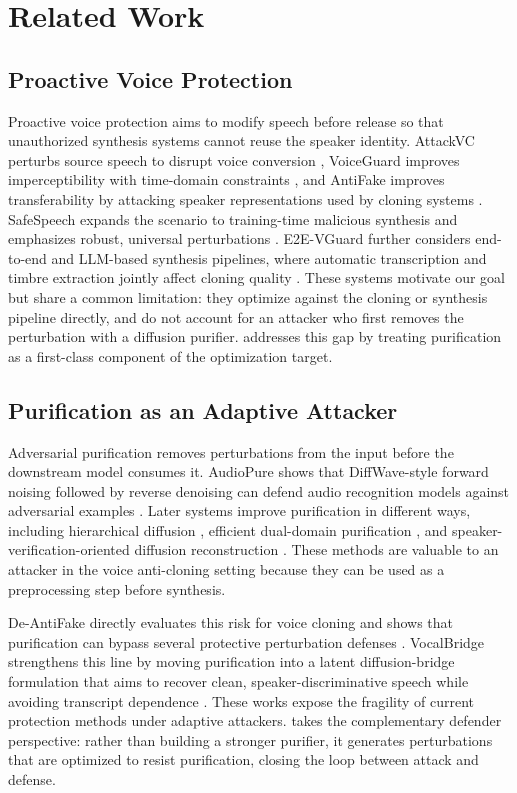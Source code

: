 \section{Related Work}

\subsection{Proactive Voice Protection}

Proactive voice protection aims to modify speech before release so that unauthorized synthesis systems cannot reuse the speaker identity. 
AttackVC perturbs source speech to disrupt voice conversion \cite{huang2021attackvc}, 
VoiceGuard improves imperceptibility with time-domain constraints \cite{li2023voiceguard}, 
and AntiFake improves transferability by attacking speaker representations used by cloning systems \cite{yu2023antifake}. 
SafeSpeech expands the scenario to training-time malicious synthesis and emphasizes robust, universal perturbations \cite{zhang2025safespeech}. 
E2E-VGuard further considers end-to-end and LLM-based synthesis pipelines, where automatic transcription and timbre extraction jointly affect cloning quality \cite{zhang2025e2evguard}. 
These systems motivate our goal but share a common limitation: they optimize against the cloning or synthesis pipeline directly, 
and do not account for an attacker who first removes the perturbation with a diffusion purifier. 
\method{} addresses this gap by treating purification as a first-class component of the optimization target.

\subsection{Purification as an Adaptive Attacker}

Adversarial purification removes perturbations from the input before the downstream model consumes it. 
AudioPure shows that DiffWave-style forward noising followed by reverse denoising can defend audio recognition models against adversarial examples \cite{wu2023audiopure}. 
Later systems improve purification in different ways, including hierarchical diffusion \cite{guo2024wavepurifier}, efficient dual-domain purification \cite{tan2024dualpure}, 
and speaker-verification-oriented diffusion reconstruction \cite{bai2024dap}. 
These methods are valuable to an attacker in the voice anti-cloning setting because they can be used as a preprocessing step before synthesis.

De-AntiFake directly evaluates this risk for voice cloning and shows that purification can bypass several protective perturbation defenses \cite{fan2025deantifake}. 
VocalBridge strengthens this line by moving purification into a latent diffusion-bridge formulation that aims to recover clean, 
speaker-discriminative speech while avoiding transcript dependence \cite{abbasihafshejani2026vocalbridge}. 
These works expose the fragility of current protection methods under adaptive attackers. 
\method{} takes the complementary defender perspective: rather than building a stronger purifier, 
it generates perturbations that are optimized to resist purification, closing the loop between attack and defense.

